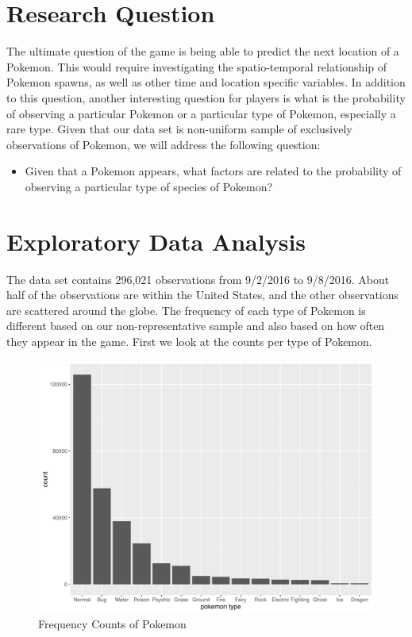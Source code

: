 \documentclass{article}
\begin{document}
\section{Research Question}

The ultimate question of the game is being able to predict the next location of a Pokemon. This would require investigating the spatio-temporal relationship of Pokemon spawns, as well as other time and location specific variables. In addition to this question, another interesting question for players is what is the probability of observing a particular Pokemon or a particular type of Pokemon, especially a rare type. Given that our data set is non-uniform sample of exclusively observations of Pokemon, we will address the following question:

\begin{itemize}

	\item Given that a Pokemon appears, what factors are related to the probability of observing a particular type of species of Pokemon?

\end{itemize}

\section{Exploratory Data Analysis}

The data set contains 296,021 observations from 9/2/2016 to 9/8/2016. About half of the observations are within the United States, and the other observations are scattered around the globe. The frequency of each type of Pokemon is different based on our non-representative sample and also based on how often they appear in the game. First we look at the counts per type of Pokemon.

\begin{figure}[H]
\centering
\includegraphics[scale = 0.4]{count_by_type.pdf}
\caption{Frequency Counts of Pokemon}
\end{figure}
\end{document}

